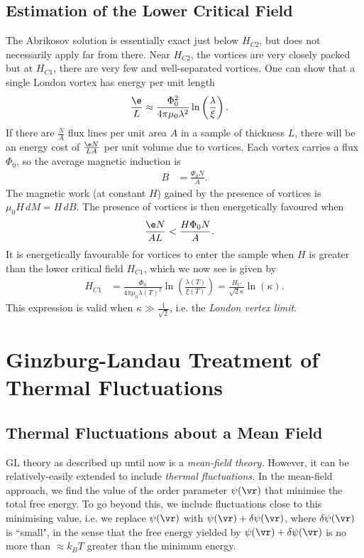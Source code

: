 \documentclass[a4paper, 11pt, normalem]{report}
\begin{document}
\section{Estimation of the Lower Critical Field}
The Abrikosov solution is essentially exact just below $H_{C2}$, but does not necessarily apply far from there.
Near $H_{C2}$, the vortices are very closely packed but at $H_{C1}$, there are very few and well-separated vortices.
One can show that a single London vortex has energy per unit length
\begin{align}
    \frac{\e}{L} &\approx \frac{\Phi_0^2}{4\pi\mu_0\lambda^2}\ln\left(\frac{\lambda}{\xi}\right).
\end{align}
If there are $\frac{N}{A}$ flux lines per unit area $A$ in a sample of thickness $L$, there will be an energy cost of $\frac{\e N}{LA}$ per unit volume due to vortices.
Each vortex carries a flux $\Phi_0$, so the average magnetic induction is
\begin{align}
    B &= \frac{\Phi_0N}{A}.
\end{align}
The magnetic work (at constant $H$) gained by the presence of vortices is $\mu_0H\,dM = H\,dB$.
The presence of vortices is then energetically favoured when
\begin{align}
    \frac{\e N}{AL} &< \frac{H\Phi_0N}{A}.
\end{align}
It is energetically favourable for vortices to enter the sample when $H$ is greater than the lower critical field $H_{C1}$, which we now see is given by
\begin{align}
    H_{C1} &= \frac{\Phi_0}{4\pi\mu_0\lambda(T)^2}\ln\left(\frac{\lambda(T)}{\xi(T)}\right) = \frac{H_C}{\sqrt{2}\kappa}\ln(\kappa).
\end{align}
This expression is valid when $\kappa\gg\frac{1}{\sqrt{2}}$, i.e. the \emph{London vertex limit}.

\chapter{Ginzburg-Landau Treatment of Thermal Fluctuations}
\section{Thermal Fluctuations about a Mean Field}
GL theory as described up until now is a \emph{mean-field theory.}
However, it can be relatively-easily extended to include \emph{thermal fluctuations.}
In the mean-field approach, we find the value of the order parameter $\psi(\vr)$ that minimise the total free energy.
To go beyond this, we include fluctuations close to this minimising value, i.e. we replace $\psi(\vr)$ with $\psi(\vr)+\delta\psi(\vr)$, where $\delta\psi(\vr)$ is ``small", in the sense that the free energy yielded by $\psi(\vr)+\delta\psi(\vr)$ is no more than $\approx k_BT$ greater than the minimum energy.
\end{document}
